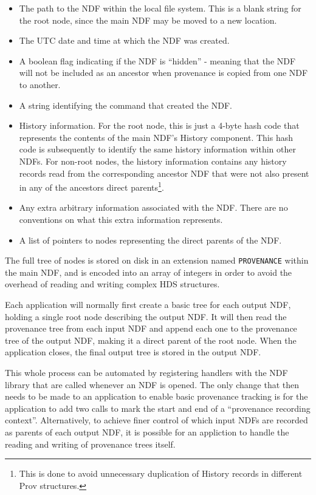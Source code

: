 \documentclass[final,authoryear,5p,times,twocolumn]{elsarticle}
\begin{document}
\begin{itemize}
\item The path to the NDF within the local file system. This is a blank
string for the root node, since the main NDF may be moved to a new location.
\item The UTC date and time at which the NDF was created.
\item A boolean flag indicating if the NDF is ``hidden'' - meaning that
the NDF will not be included as an ancestor when provenance is copied
from one NDF to another.
\item A string identifying the command that created the NDF.
\item History information. For the root node, this is just a 4-byte hash code
that represents the contents of the main NDF's History component. This hash
code is subsequently to identify the same history information within other
NDFs. For non-root nodes, the history information contains any history
records read from the corresponding ancestor NDF that were not also present
in any of the ancestors direct parents\footnote{This is done to avoid unnecessary
duplication of History records in different Prov structures.}.
\item Any extra arbitrary information associated with the NDF. There are no conventions on what this extra information
represents.
\item A list of pointers to nodes representing the direct parents of the
NDF.
\end{itemize}

The full tree of nodes is stored on disk in an extension named
\texttt{PROVENANCE} within the main NDF, and is encoded into an array of
integers in order to avoid the overhead of reading and writing complex
HDS structures.

Each application will normally first create a basic tree for each output
NDF, holding a single root node describing the output NDF. It will then
read the provenance tree from each input NDF and append each one to the
provenance tree of the output NDF, making it a direct parent of the root
node. When the application closes, the final output tree is stored in
the output NDF.

This whole process can be automated by registering handlers with the NDF
library that are called whenever an NDF is opened. The only change that
then needs to be made to an application to enable basic provenance tracking is for the
application to add two calls to mark the start and end of a ``provenance
recording context''. Alternatively, to achieve finer control of which
input NDFs are recorded as parents of each output NDF, it is possible for
an appliction to handle the reading and writing of provenance trees
itself.
\end{document}
